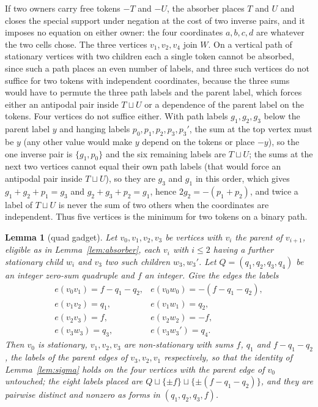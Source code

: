 \documentclass[11pt,a4paper]{article}
\theoremstyle{plain}
\newtheorem{lemma}[theorem]{Lemma}
\theoremstyle{definition}
\theoremstyle{remark}
\begin{document}
If two owners carry free tokens $-T$ and $-U$, the absorber places $T$ and $U$
and closes the special support under negation at the cost of two inverse
pairs, and it imposes no equation on either owner: the four coordinates
$a,b,c,d$ are whatever the two cells chose.  The three vertices $v_1,v_2,v_4$
join $W$.  On a vertical path of stationary vertices with two children each a
single token cannot be absorbed, since such a path places an even number of
labels, and three such vertices do not suffice for two tokens with independent
coordinates, because the three sums would have to permute the three path
labels and the parent label, which forces either an antipodal pair inside
$T\sqcup U$ or a dependence of the parent label on the tokens.  Four vertices
do not suffice either.  With path labels $g_1,g_2,g_3$ below the parent label
$y$ and hanging labels $p_0,p_1,p_2,p_3,p_3'$, the sum at the top vertex must be
$y$ (any other value would make $y$ depend on the tokens or place $-y$), so the
one inverse pair is $\{g_1,p_0\}$ and the six remaining labels are
$T\sqcup U$; the sums at the next two vertices cannot equal their own path
labels (that would force an antipodal pair inside $T\sqcup U$), so they are
$g_3$ and $g_1$ in this order, which gives $g_1+g_2+p_1=g_3$ and
$g_2+g_3+p_2=g_1$, hence $2g_2=-(p_1+p_2)$, and twice a label of $T\sqcup U$ is
never the sum of two others when the coordinates are independent.  Thus five
vertices is the minimum for two tokens on a binary path.

\begin{lemma}[quad gadget]\label{lem:quad}
Let $v_0,v_1,v_2,v_3$ be vertices with $v_i$ the parent of $v_{i+1}$,
eligible as in Lemma~\ref{lem:absorber}, each $v_i$ with $i\le 2$ having a
further stationary child $w_i$ and $v_3$ two such children $w_3,w_3'$.  Let
$Q=(q_1,q_2,q_3,q_4)$ be an integer zero-sum quadruple and $f$ an integer.
Give the edges the labels
\[
\begin{array}{lll}
e(v_0v_1)=f-q_1-q_2, & e(v_0w_0)=-(f-q_1-q_2), \\
e(v_1v_2)=q_1,       & e(v_1w_1)=q_2,          \\
e(v_2v_3)=f,         & e(v_2w_2)=-f,           \\
e(v_3w_3)=q_3,       & e(v_3w_3')=q_4.
\end{array}
\]
Then $v_0$ is stationary, $v_1,v_2,v_3$ are non-stationary with sums
$f$, $q_1$ and $f-q_1-q_2$, the labels of the parent edges of $v_3,v_2,v_1$
respectively, so that the identity of Lemma~\ref{lem:sigma} holds on the four
vertices with the parent edge of $v_0$ untouched; the eight labels placed are
$Q\sqcup\{\pm f\}\sqcup\{\pm(f-q_1-q_2)\}$, and they are pairwise distinct and
nonzero as forms in $(q_1,q_2,q_3,f)$.
\end{lemma}
\end{document}
